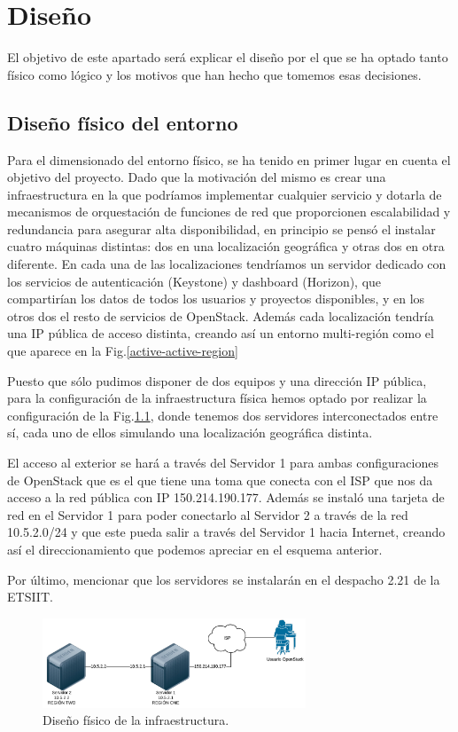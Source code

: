\chapter{Diseño} \label{chap:diseno}
El objetivo de este apartado será explicar el diseño por el que se ha optado tanto físico como lógico y los motivos que han hecho que tomemos esas decisiones. 

\section{Diseño físico del entorno}

Para el dimensionado del entorno físico, se ha tenido en primer lugar en cuenta el objetivo del proyecto. Dado que la motivación del mismo es crear una infraestructura en la que podríamos implementar cualquier servicio y dotarla de mecanismos de orquestación de funciones de red que proporcionen escalabilidad y redundancia para asegurar alta disponibilidad, en principio se pensó el instalar cuatro máquinas distintas: dos en una localización geográfica y otras dos en otra diferente. En cada una de las localizaciones tendríamos un servidor dedicado con los servicios de autenticación (Keystone) y dashboard (Horizon), que compartirían los datos de todos los usuarios y proyectos disponibles, y en los otros dos el resto de servicios de OpenStack. Además cada localización tendría una IP pública de acceso distinta, creando así un entorno multi-región como el que aparece en la Fig.\ref{active-active-region}

Puesto que sólo pudimos disponer de dos equipos y una dirección IP pública, para la configuración de la infraestructura física hemos optado por realizar la configuración de la Fig.\ref{fisico}, donde tenemos dos servidores interconectados entre sí, cada uno de ellos simulando una localización geográfica distinta.

El acceso al exterior se hará a través del Servidor 1 para ambas configuraciones de OpenStack que es el que tiene una toma que conecta con el ISP que nos da acceso a la red pública con IP 150.214.190.177. Además se instaló una tarjeta de red en el Servidor 1 para poder conectarlo al Servidor 2 a través de la red 10.5.2.0/24 y que este pueda salir a través del Servidor 1 hacia Internet, creando así el direccionamiento que podemos apreciar en el esquema anterior.

Por último, mencionar que los servidores se instalarán en el despacho 2.21 de la ETSIIT.

\begin{figure}
    \centering
    \includegraphics[width=0.7\textwidth]{imagenes/capitulo5/fisico.png}
    \caption{Diseño físico de la infraestructura.}
	\vspace{0.3cm}
    \label{fisico}
\end{figure}

